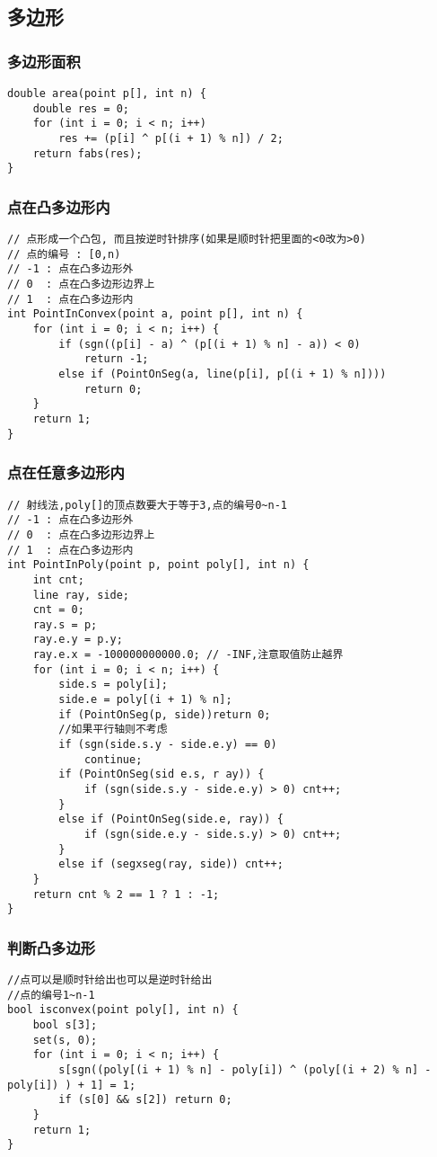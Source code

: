 \documentclass[a4]{article}
\begin{document}
\subsection{多边形}
\subsubsection{多边形面积}
\begin{lstlisting}
double area(point p[], int n) {
    double res = 0;
    for (int i = 0; i < n; i++)
        res += (p[i] ^ p[(i + 1) % n]) / 2;
    return fabs(res);
}
\end{lstlisting}
\subsubsection{点在凸多边形内}
\begin{lstlisting}
// 点形成一个凸包, 而且按逆时针排序(如果是顺时针把里面的<0改为>0)
// 点的编号 : [0,n)
// -1 : 点在凸多边形外
// 0  : 点在凸多边形边界上
// 1  : 点在凸多边形内
int PointInConvex(point a, point p[], int n) {
	for (int i = 0; i < n; i++) {
		if (sgn((p[i] - a) ^ (p[(i + 1) % n] - a)) < 0)
			return -1;
		else if (PointOnSeg(a, line(p[i], p[(i + 1) % n])))
			return 0;
	}
	return 1;
}
\end{lstlisting}
\subsubsection{点在任意多边形内}
\begin{lstlisting}
// 射线法,poly[]的顶点数要大于等于3,点的编号0~n-1
// -1 : 点在凸多边形外
// 0  : 点在凸多边形边界上
// 1  : 点在凸多边形内
int PointInPoly(point p, point poly[], int n) {
	int cnt;
	line ray, side;
	cnt = 0;
	ray.s = p;
	ray.e.y = p.y;
	ray.e.x = -100000000000.0; // -INF,注意取值防止越界
	for (int i = 0; i < n; i++) {
		side.s = poly[i];
		side.e = poly[(i + 1) % n];
		if (PointOnSeg(p, side))return 0;
		//如果平行轴则不考虑
		if (sgn(side.s.y - side.e.y) == 0)
			continue;
		if (PointOnSeg(sid e.s, r ay)) {
			if (sgn(side.s.y - side.e.y) > 0) cnt++;
		}
		else if (PointOnSeg(side.e, ray)) {
			if (sgn(side.e.y - side.s.y) > 0) cnt++;
		}
		else if (segxseg(ray, side)) cnt++;
	}
	return cnt % 2 == 1 ? 1 : -1;
}
\end{lstlisting}
\subsubsection{判断凸多边形}
\begin{lstlisting}
//点可以是顺时针给出也可以是逆时针给出
//点的编号1~n-1
bool isconvex(point poly[], int n) {
	bool s[3];
	set(s, 0);
	for (int i = 0; i < n; i++) {
		s[sgn((poly[(i + 1) % n] - poly[i]) ^ (poly[(i + 2) % n] - poly[i]) ) + 1] = 1;
		if (s[0] && s[2]) return 0;
	}
	return 1;
}
\end{lstlisting}
\end{document}
